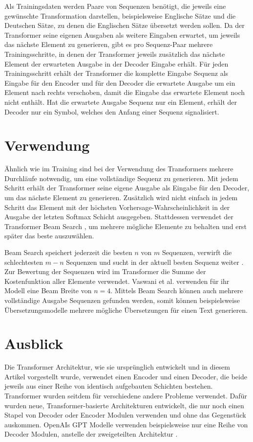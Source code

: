 \documentclass[conference]{IEEEtran}
\begin{document}
Als Trainingsdaten werden Paare von Sequenzen benötigt, die jeweils eine gewünschte Transformation darstellen, beispielsweise Englische Sätze und die Deutschen Sätze, zu denen die Englischen Sätze übersetzt werden sollen. Da der Transformer seine eigenen Ausgaben als weitere Eingaben erwartet, um jeweils das nächste Element zu generieren, gibt es pro Sequenz-Paar mehrere Trainingsschritte, in denen der Transformer jeweils zusätzlich das nächste Element der erwarteten Ausgabe in der Decoder Eingabe erhält. Für jeden Trainingsschritt erhält der Transformer die komplette Eingabe Sequenz als Eingabe für den Encoder und für den Decoder die erwartete Ausgabe um ein Element nach rechts verschoben, damit die Eingabe das erwartete Element noch nicht enthält. Hat die erwartete Ausgabe Sequenz nur ein Element, erhält der Decoder nur ein Symbol, welches den Anfang einer Sequenz signalisiert.


\section{Verwendung}
Ähnlich wie im Training sind bei der Verwendung des Transformers mehrere Durchläufe notwendig, um eine vollständige Sequenz zu generieren. Mit jedem Schritt erhält der Transformer seine eigene Ausgabe als Eingabe für den Decoder, um das nächste Element zu generieren. Zusätzlich wird nicht einfach in jedem Schritt das Element mit der höchsten Vorhersage-Wahrscheinlichkeit in der Ausgabe der letzten Softmax Schicht ausgegeben. Stattdessen verwendet der Transformer Beam Search \cite{attention_is_all_you_need}, um mehrere mögliche Elemente zu behalten und erst später das beste auszuwählen.

Beam Search speichert jederzeit die besten $n$ von $m$ Sequenzen, verwirft die schlechtesten $m-n$ Sequenzen und sucht in der aktuell besten Sequenz weiter \cite{beam_search}. Zur Bewertung der Sequenzen wird im Transformer die Summe der Kostenfunktion aller Elemente verwendet. Vaswani et al. \cite{attention_is_all_you_need} verwenden für ihr Modell eine Beam Breite von $n = 4$. Mittels Beam Search können auch mehrere vollständige Ausgabe Sequenzen gefunden werden, somit können beispielsweise Übersetzungsmodelle mehrere mögliche Übersetzungen für einen Text generieren.


\section{Ausblick}
Die Transformer Architektur, wie sie ursprünglich entwickelt und in diesem Artikel vorgestellt wurde, verwendet einen Encoder und einen Decoder, die beide jeweils aus einer Reihe von identisch aufgebauten Schichten bestehen. Transformer wurden seitdem für verschiedene andere Probleme verwendet. Dafür wurden neue, Transformer-basierte Architekturen entwickelt, die nur noch einen Stapel von Decoder oder Encoder Modulen verwenden und ohne das Gegenstück auskommen. OpenAIs GPT Modelle verwenden beispielsweise nur eine Reihe von Decoder Modulen, anstelle der zweigeteilten Architektur \cite{gpt_1}.
\end{document}
